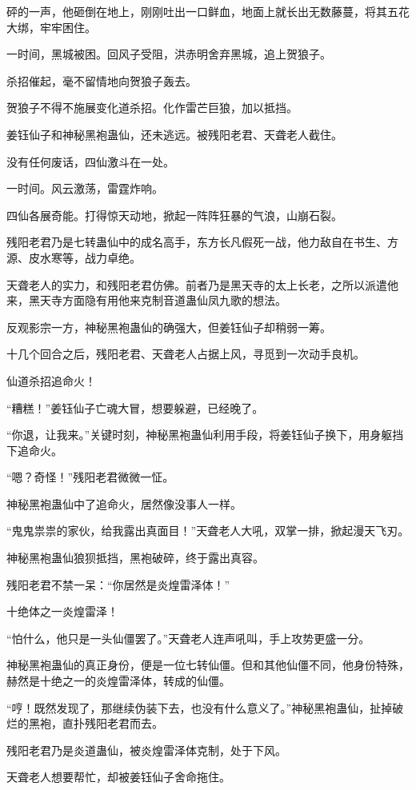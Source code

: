 \begin{this_body}
砰的一声，他砸倒在地上，刚刚吐出一口鲜血，地面上就长出无数藤蔓，将其五花大绑，牢牢困住。

一时间，黑城被困。回风子受阻，洪赤明舍弃黑城，追上贺狼子。

杀招催起，毫不留情地向贺狼子轰去。

贺狼子不得不施展变化道杀招。化作雷芒巨狼，加以抵挡。

姜钰仙子和神秘黑袍蛊仙，还未逃远。被残阳老君、天聋老人截住。

没有任何废话，四仙激斗在一处。

一时间。风云激荡，雷霆炸响。

四仙各展奇能。打得惊天动地，掀起一阵阵狂暴的气浪，山崩石裂。

残阳老君乃是七转蛊仙中的成名高手，东方长凡假死一战，他力敌自在书生、方源、皮水寒等，战力卓绝。

天聋老人的实力，和残阳老君仿佛。前者乃是黑天寺的太上长老，之所以派遣他来，黑天寺方面隐有用他来克制音道蛊仙凤九歌的想法。

反观影宗一方，神秘黑袍蛊仙的确强大，但姜钰仙子却稍弱一筹。

十几个回合之后，残阳老君、天聋老人占据上风，寻觅到一次动手良机。

仙道杀招追命火！

“糟糕！”姜钰仙子亡魂大冒，想要躲避，已经晚了。

“你退，让我来。”关键时刻，神秘黑袍蛊仙利用手段，将姜钰仙子换下，用身躯挡下追命火。

“嗯？奇怪！”残阳老君微微一怔。

神秘黑袍蛊仙中了追命火，居然像没事人一样。

“鬼鬼祟祟的家伙，给我露出真面目！”天聋老人大吼，双掌一排，掀起漫天飞刃。

神秘黑袍蛊仙狼狈抵挡，黑袍破碎，终于露出真容。

残阳老君不禁一呆：“你居然是炎煌雷泽体！”

十绝体之一炎煌雷泽！

“怕什么，他只是一头仙僵罢了。”天聋老人连声吼叫，手上攻势更盛一分。

神秘黑袍蛊仙的真正身份，便是一位七转仙僵。但和其他仙僵不同，他身份特殊，赫然是十绝之一的炎煌雷泽体，转成的仙僵。

“哼！既然发现了，那继续伪装下去，也没有什么意义了。”神秘黑袍蛊仙，扯掉破烂的黑袍，直扑残阳老君而去。

残阳老君乃是炎道蛊仙，被炎煌雷泽体克制，处于下风。

天聋老人想要帮忙，却被姜钰仙子舍命拖住。


\end{this_body}
